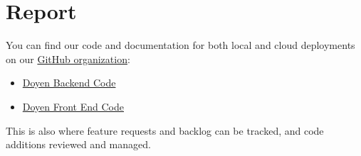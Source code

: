 \documentclass[11pt,twoside]{report} %
\begin{document}

\normalfont

\chapter{Report}

You can find our code and documentation for both local and cloud deployments on our \href{https://github.com/DoyenTeam}{GitHub organization}:
\begin{itemize}
    \item \href{https://github.com/DoyenTeam/doyen}{Doyen Backend Code}
    \item \href{https://github.com/DoyenTeam/doyenclient}{Doyen Front End Code}
\end{itemize}
This is also where feature requests and backlog can be tracked, and code additions reviewed and managed.

 







\vfill
\pagebreak


\begin{appendices}





\end{appendices}
\end{document}
